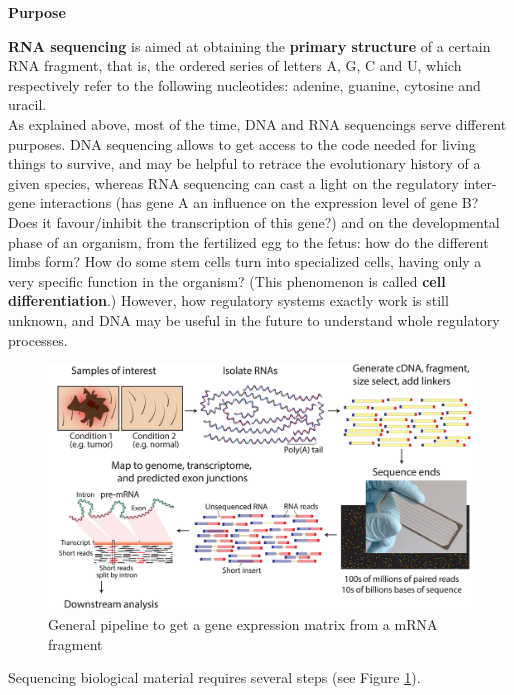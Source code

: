 \documentclass{report}
\begin{document}
\textbf{Purpose}
\bigskip

\textbf{RNA sequencing} is aimed at obtaining the \textbf{primary structure} of a certain RNA fragment, that is, the ordered series of letters A, G, C and U, which respectively refer to the following nucleotides: adenine, guanine, cytosine and uracil.\\

As explained above, most of the time, DNA and RNA sequencings serve different purposes. DNA sequencing allows to get access to the code needed for living things to survive, and may be helpful to retrace the evolutionary history of a given species, whereas RNA sequencing can cast a light on the regulatory inter-gene interactions (has gene A an influence on the expression level of gene B? Does it favour/inhibit the transcription of this gene?) and on the developmental phase of an organism, from the fertilized egg to the fetus: how do the different limbs form? How do some stem cells turn into specialized cells, having only a very specific function in the organism? (This phenomenon is called \textbf{cell differentiation}.) However, how regulatory systems exactly work is still unknown, and DNA may be useful in the future to understand whole regulatory processes.

\begin{figure}[H]
\centering
\includegraphics[scale=1.5]{illustrations/sequencing.png}
\caption{General pipeline to get a gene expression matrix from a mRNA fragment}
\label{sequencing}
\end{figure}

Sequencing biological material requires several steps (see Figure \ref{sequencing}).\\
\end{document}
